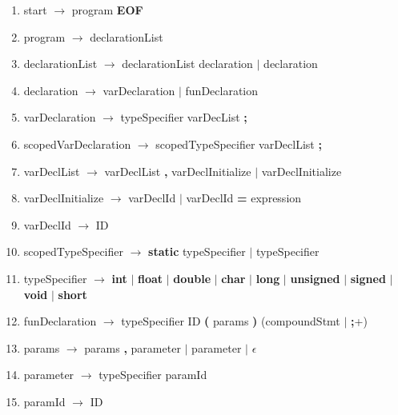 \documentclass{article}
\begin{document}
\begin{enumerate}
\item start $\rightarrow$ program \textbf{EOF}
\item program $\rightarrow$ declarationList
\item declarationList $\rightarrow$ declarationList declaration $|$ declaration
\item declaration $\rightarrow$ varDeclaration $|$ funDeclaration

\item varDeclaration $\rightarrow$ typeSpecifier varDecList \textbf{;}
\item scopedVarDeclaration $\rightarrow$ scopedTypeSpecifier varDeclList \textbf{;}
\item varDeclList $\rightarrow$ varDeclList \textbf{,} varDeclInitialize $|$ varDeclInitialize
\item varDeclInitialize $\rightarrow$ varDeclId $|$ varDeclId \textbf{=} expression
\item varDeclId $\rightarrow$ ID
\item scopedTypeSpecifier $\rightarrow$ \textbf{static} typeSpecifier $|$ typeSpecifier
\item typeSpecifier $\rightarrow$ \textbf{int} $|$ \textbf{float} $|$ \textbf{double} $|$ \textbf{char} $|$ \textbf{long} $|$ \textbf{unsigned} $|$ \textbf{signed} $|$ \textbf{void} $|$ \textbf{short}

\item funDeclaration $\rightarrow$ typeSpecifier ID \textbf{(} params \textbf{)} (compoundStmt $|$ \textbf{;}+)
\item params $\rightarrow$ params \textbf{,} parameter $|$ parameter $|$ $\epsilon$
\item parameter $\rightarrow$ typeSpecifier paramId
\item paramId $\rightarrow$ ID


\end{enumerate}
\end{document}
